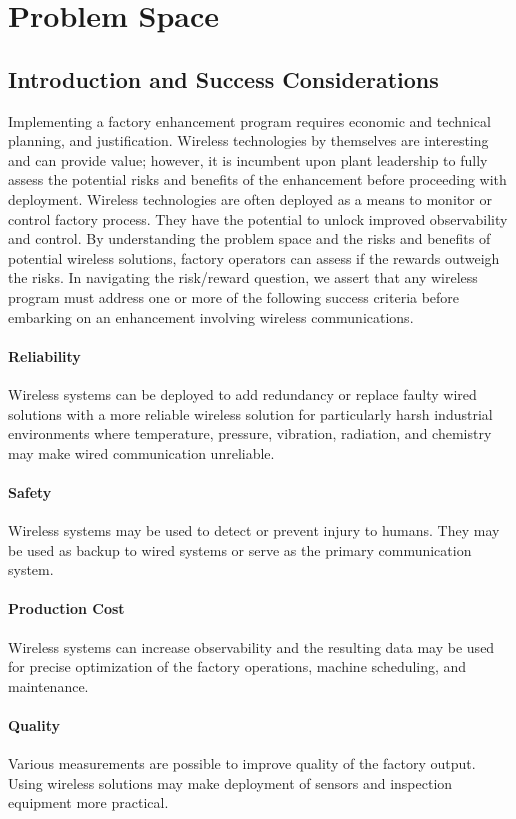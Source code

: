     \section{Problem Space}
    
    \subsection{Introduction and Success Considerations}
    Implementing a factory enhancement program requires economic and technical planning, and justification.  Wireless technologies by themselves are interesting and can provide value; however, it is incumbent upon plant leadership to fully assess the potential risks and benefits of the enhancement before proceeding with deployment. Wireless technologies are often deployed as a means to monitor or control factory process. They have the potential to unlock improved observability and control. By understanding the problem space and the risks and benefits of potential wireless solutions, factory operators can assess if the rewards outweigh the risks.  In navigating the risk/reward question, we assert that any wireless program must address one or more of the following success criteria before embarking on an enhancement involving wireless communications.
    
\paragraph{Reliability} Wireless systems can be deployed to add redundancy or replace faulty wired solutions with a more reliable wireless solution for particularly harsh industrial environments where temperature, pressure, vibration, radiation, and chemistry may make wired communication unreliable.
\paragraph{Safety} Wireless systems may be used to detect or prevent injury to humans.  They may be used as backup to wired systems or serve as the primary communication system.
\paragraph{Production Cost} Wireless systems can increase observability and the resulting data may be used for precise optimization of the factory operations, machine scheduling, and maintenance.
\paragraph{Quality} Various measurements are possible to improve quality of the factory output. Using wireless solutions may make deployment of sensors and inspection equipment more practical. 
